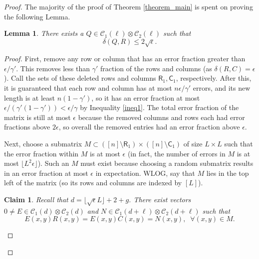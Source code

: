 \documentclass[11pt]{article}
\newcommand{\C}{\mathcal{C}}
\newtheorem{claim}[theorem]{Claim}
\newtheorem{lemma}[theorem]{Lemma}
\newcommand{\snote}[1]{{\color{blue} [Sumegha: #1]}}
\newcommand{\snote}[1]{}
\newcommand{\Row}{\mathsf{R}}
\newcommand{\Col}{\mathsf{C}}
\renewcommand{\d}{d}
\begin{document}
\begin{proof}
The majority of the proof of Theorem \ref{theorem_main} is spent on proving the following Lemma.

\begin{lemma}
\label{lemma1}
There exists a $Q \in \C_1(\ell) \otimes \C_2(\ell)$ such that $$\delta(Q, R) \leq 2 \sqrt{\epsilon}.$$
\end{lemma}

\begin{proof}
First, remove any row or column that has an error fraction greater than $\epsilon/\gamma'$. This removes less than $\gamma'$ fraction of the rows and columns (as $\delta(R,C)=\epsilon$). Call the sets of these deleted rows and columns $\Row_1, \Col_1$, respectively. After this, it is guaranteed that each row and column has at most $n\epsilon/\gamma'$ errors, and its new length is at least $n(1-\gamma')$, so it has an error fraction at most $\epsilon/(\gamma'(1-\gamma')) < \epsilon/\gamma$ by Inequality \eqref{ineq1}. The total error fraction of the matrix is still at most $\epsilon$ because the removed columns and rows each had error fractions above $2\epsilon$, so overall the removed entries had an error fraction above $\epsilon$.

Next, choose a submatrix $M \subset ([n] \setminus \Row_1) \times ([n] \setminus \Col_1)$ of size $L \times L$ such that the error fraction within $M$ is at most $\epsilon$ (in fact, the number of errors in $M$ is at most $\lfloor L^2 \epsilon\rfloor$). Such an $M$ must exist because choosing a random submatrix results in an error fraction at most $\epsilon$ in expectation. WLOG, say that $M$ lies in the top left of the matrix (so its rows and columns are indexed by $[L]$).

\begin{claim}
\label{claim1}
Recall that $\d = \lfloor\sqrt{\epsilon}L\rfloor + 2 + g$. There exist vectors $0 \neq E\in \C_1(\d)\otimes \C_2(\d)$ and $N\in \C_1(\d + \ell)\otimes \C_2(\d + \ell)$ such that 
\[E(x,y)R(x,y)=E(x,y)C(x,y)=N(x,y),\;\; \forall (x,y)\in M.\]
\end{claim}


\end{proof}
\end{proof}
\end{document}
